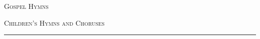 \setlength{\columnseprule}{0.4pt}
\setlength{\parindent}{0pt}
\setlength{\parskip}{0pt}
\setlength\topsep{0pt}
\setlength\headsep{8pt}
\setlength{}
\setlength\headheight{24pt}

\newcommand{\lllap}[1]{\makebox[0pt][r]{#1}}

\pagestyle{fancy}
\fancyhf{}

\ifmetrical
\hypertarget{metricalindex}{}
\renewcommand{\headrulewidth}{0.4pt}

\begin{multicols}{3}
{\small
\setlength{}
\setlength\baselineskip{11.0pt plus 1.0pt minus 0.5pt}

}
\end{multicols}

\newpage
\fi

\hypertarget{firstlinesindex}{}
\renewcommand{\headrulewidth}{0.4pt}
\setlength{\columnsep}{14pt}
\begin{multicols}{2}
{\small
\setlength\baselineskip{10pt minus 1pt}

}
\end{multicols}
\bigbreak

\hypertarget{gospelindex}{}
{\hfill\large\textsc{Gospel Hymns}\hfill}
\begin{multicols}{2}
{\small
\setlength\baselineskip{10pt minus 1pt}

}
\end{multicols}
\bigbreak

\hypertarget{childrensindex}{}
{\hfill\large\textsc{Children's Hymns and Choruses}\hfill}
\begin{multicols}{2}
{\small
\setlength\baselineskip{10pt minus 1pt}

}
\end{multicols}
\hfill\noindent\rule{0.5\textwidth}{.4pt}\hfill
